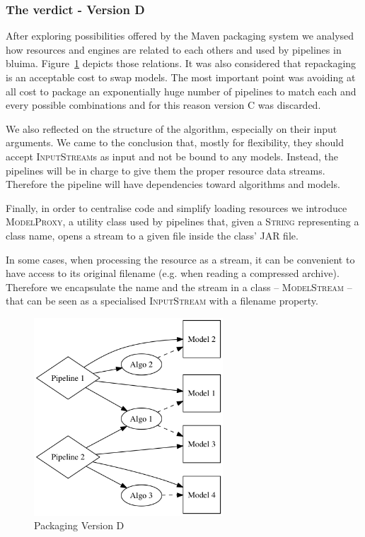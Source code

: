 \documentclass{article}
\newcommand{\ID}[1]{{\textsc{#1}}}
\newcommand{\JAR}{JAR\xspace}
\begin{document}
\begin{appendices}
\subsubsection{The verdict - Version D}

After exploring possibilities offered by the Maven packaging system we analysed how resources and engines are related to each others and used by pipelines in bluima. Figure~\ref{fig:pkgsysD} depicts those relations. It was also considered that repackaging is an acceptable cost to swap models. The most important point was avoiding at all cost to package an exponentially huge number of pipelines to match each and every possible combinations and for this reason version C was discarded.

We also reflected on the structure of the algorithm, especially on their input arguments. We came to the conclusion that, mostly for flexibility, they should accept \ID{InputStream}s as input and not be bound to any models. Instead, the pipelines will be in charge to give them the proper resource data streams. Therefore the pipeline will have dependencies toward algorithms and models.

Finally, in order to centralise code and simplify loading resources we introduce \ID{ModelProxy}, a
utility class used by pipelines that, given a \ID{String} representing a class name, opens a stream
to a given file inside the class' \JAR file.

In some cases, when processing the resource as a stream, it can be convenient to have access to its original filename (e.g. when reading a compressed archive). Therefore we encapsulate the name and the stream in a class -- \ID{ModelStream} -- that can be seen as a specialised \ID{InputStream} with a filename property.

\begin{figure}
\centering
\includegraphics[width=200pt]{res/packaging_version_D.png}
\caption{Packaging Version D}
\label{fig:pkgsysD}
\end{figure}



\end{appendices}
\end{document}
